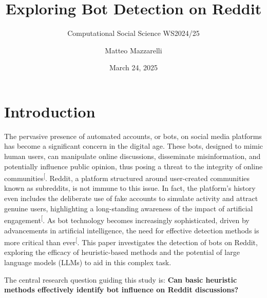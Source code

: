 \documentclass[
  12pt,
  letterpaper,
  DIV=11,
  numbers=noendperiod]{scrartcl}
\title{Exploring Bot Detection on Reddit}
\subtitle{Computational Social Science WS2024/25}
\author{Matteo Mazzarelli}
\date{March 24, 2025}
\renewcommand*\contentsname{Table of contents}
\newcommand\contentsname{Table of contents}
\begin{document}
\maketitle

\renewcommand*\contentsname{Table of contents}
{
\hypersetup{linkcolor=}
\setcounter{tocdepth}{3}
\tableofcontents
}

\section{Introduction}\label{introduction}

The pervasive presence of automated accounts, or bots, on social media
platforms has become a significant concern in the digital age. These
bots, designed to mimic human users, can manipulate online discussions,
disseminate misinformation, and potentially influence public opinion,
thus posing a threat to the integrity of online
communities\textsuperscript{{[}\citeproc{ref-botdetectionreddit}{1}{]}}.
Reddit, a platform structured around user-created communities known as
subreddits, is not immune to this issue. In fact, the platform's history
even includes the deliberate use of fake accounts to simulate activity
and attract genuine users, highlighting a long-standing awareness of the
impact of artificial
engagement\textsuperscript{{[}\citeproc{ref-redditbotproblem}{2}{]}}. As
bot technology becomes increasingly sophisticated, driven by
advancements in artificial intelligence, the need for effective
detection methods is more critical than
ever\textsuperscript{{[}\citeproc{ref-botdetectionreddit}{1}{]}}. This
paper investigates the detection of bots on Reddit, exploring the
efficacy of heuristic-based methods and the potential of large language
models (LLMs) to aid in this complex task.

The central research question guiding this study is: \textbf{Can basic
heuristic methods effectively identify bot influence on Reddit
discussions?}
\end{document}
